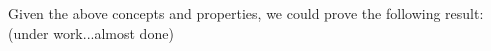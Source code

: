 Given the above concepts and properties, we could prove the following result:
(under work...almost done)
%
%
%
%
%
